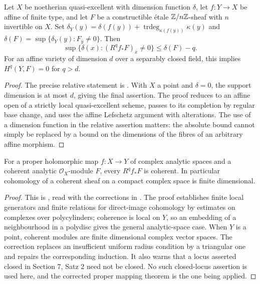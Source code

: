 \begin{theorem}\label{thm:B3-affine-cd}
Let $X$ be noetherian quasi-excellent with dimension function
$\delta$, let $f:Y\to X$ be affine of finite type, and let $F$ be
a constructible \'etale ${\mathbb{Z}}/n{\mathbb{Z}}$-sheaf with $n$ invertible on $X$.
Set $\delta_Y(y)=\delta(f(y))+\operatorname{trdeg}_{\kappa(f(y))}\kappa(y)$
and $\delta(F)=\sup\{\delta_Y(y):F_{\bar y}\ne0\}$.
Then
\[
 \sup\{\delta(x):(R^qf_*F)_{\bar x}\ne0\}\leq\delta(F)-q.
\]
For an affine variety of dimension $d$ over a separably closed field,
this implies $H^q(Y,F)=0$ for $q>d$.
\end{theorem}
\begin{proof}
The precise relative statement is
\cite[Expos\'e XV, Theorem 1.1.2 and Corollary 1.2.2, p.~219]{BILO2014}.
With $X$ a point and $\delta=0$, the support dimension is at most
$d$, giving the final assertion. The proof reduces to an affine
open of a strictly local quasi-excellent scheme, passes to its
completion by regular base change, and uses the affine Lefschetz
argument with alterations. The use of a dimension function in the
relative assertion matters: the absolute bound cannot simply be
replaced by a bound on the dimensions of the fibres of an arbitrary
affine morphism.
\end{proof}

\begin{theorem}\label{thm:B3-grauert}
For a proper holomorphic map $f:X\to Y$ of complex analytic
spaces and a coherent analytic $\mathcal O_X$-module $F$,
every $R^qf_*F$ is coherent. In particular cohomology of a
coherent sheaf on a compact complex space is finite dimensional.
\end{theorem}
\begin{proof}
This is \cite[Section 6, Hauptsatz I, p.~59]{BGrauert1960}, read
with the corrections in \cite[pp.~35--36]{BGrauert1963}.
The proof establishes finite local generators and finite relations
for direct-image cohomology by estimates on complexes over
polycylinders; coherence is local on $Y$, so an embedding of a
neighbourhood in a polydisc gives the general analytic-space case.
When $Y$ is a point, coherent modules are finite dimensional complex
vector spaces. The correction replaces an insufficient uniform
radius condition by a triangular one and repairs the corresponding
induction. It also warns that a locus asserted closed in
Section 7, Satz 2 need not be closed. No such closed-locus assertion
is used here, and the corrected proper mapping theorem is the one
being applied.
\end{proof}


